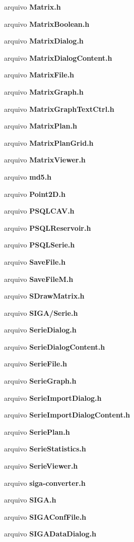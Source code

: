 \begin{DoxyCompactItemize}
arquivo {\bf Matrix.\+h}
\item 
arquivo {\bf Matrix\+Boolean.\+h}
\item 
arquivo {\bf Matrix\+Dialog.\+h}
\item 
arquivo {\bf Matrix\+Dialog\+Content.\+h}
\item 
arquivo {\bf Matrix\+File.\+h}
\item 
arquivo {\bf Matrix\+Graph.\+h}
\item 
arquivo {\bf Matrix\+Graph\+Text\+Ctrl.\+h}
\item 
arquivo {\bf Matrix\+Plan.\+h}
\item 
arquivo {\bf Matrix\+Plan\+Grid.\+h}
\item 
arquivo {\bf Matrix\+Viewer.\+h}
\item 
arquivo {\bf md5.\+h}
\item 
arquivo {\bf Point2\+D.\+h}
\item 
arquivo {\bf P\+S\+Q\+L\+C\+A\+V.\+h}
\item 
arquivo {\bf P\+S\+Q\+L\+Reservoir.\+h}
\item 
arquivo {\bf P\+S\+Q\+L\+Serie.\+h}
\item 
arquivo {\bf Save\+File.\+h}
\item 
arquivo {\bf Save\+File\+M.\+h}
\item 
arquivo {\bf S\+Draw\+Matrix.\+h}
\item 
arquivo {\bf S\+I\+G\+A/\+Serie.\+h}
\item 
arquivo {\bf Serie\+Dialog.\+h}
\item 
arquivo {\bf Serie\+Dialog\+Content.\+h}
\item 
arquivo {\bf Serie\+File.\+h}
\item 
arquivo {\bf Serie\+Graph.\+h}
\item 
arquivo {\bf Serie\+Import\+Dialog.\+h}
\item 
arquivo {\bf Serie\+Import\+Dialog\+Content.\+h}
\item 
arquivo {\bf Serie\+Plan.\+h}
\item 
arquivo {\bf Serie\+Statistics.\+h}
\item 
arquivo {\bf Serie\+Viewer.\+h}
\item 
arquivo {\bf siga-\/converter.\+h}
\item 
arquivo {\bf S\+I\+G\+A.\+h}
\item 
arquivo {\bf S\+I\+G\+A\+Conf\+File.\+h}
\item 
arquivo {\bf S\+I\+G\+A\+Data\+Dialog.\+h}
\item 

\end{DoxyCompactItemize}
